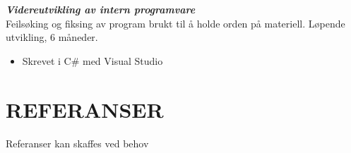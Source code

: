 \documentclass[margin, 10pt, norsk]{res} %
\begin{document}
\begin{resume}
\textbf {\emph{Videreutvikling av intern programvare}}\\
Feilsøking og fiksing av program brukt til å holde orden på materiell. Løpende utvikling, 6 måneder.
\begin{itemize}\itemsep -2pt   %
\item   Skrevet i C\# med Visual Studio
\end{itemize}

\hspace{5mm} 

\section{REFERANSER} 
Referanser kan skaffes ved behov




\end{resume}
\end{document}
